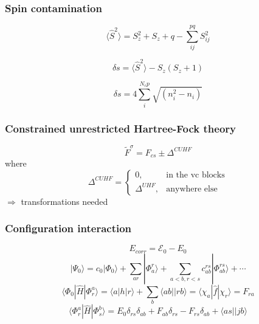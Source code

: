 \documentclass[aspectratio=169]{beamer}
\begin{document}
\begin{frame}
    \frametitle{Spin contamination}
    \begin{equation}
        \langle \hat{S}^2 \rangle = S_z^2 + S_z + q - \sum_{ij}^{pq}S_{ij}^2
    \end{equation}

    \begin{equation}
        \delta s = \langle \hat{S}^2 \rangle - S_z(S_z + 1)
    \end{equation}

    \begin{equation}
        \delta s = 4\sum^{N_cp}_i \sqrt{(n_i^2 - n_i)}
    \end{equation}

\end{frame}

\begin{frame}
    \frametitle{Constrained unrestricted Hartree-Fock theory}
    \begin{equation}
        \tilde{F}^{\sigma} = F_{cs} \pm \Delta^{CUHF}
    \end{equation}
    where
    \begin{equation}
        \Delta^{CUHF} = \begin{cases}
            0, & \mbox{in the vc blocks} \\
            \Delta^{UHF}, & \mbox{anywhere else}
        \end{cases}
    \end{equation}
    $\Longrightarrow$ transformations needed
\end{frame}

\begin{frame}
    \frametitle{Configuration interaction}
    \begin{equation}\label{eq:Ecorr}
        E_{corr} = \mathcal{E}_0 - E_0
      \end{equation}     
    \begin{equation}\label{eq:lincomb}
        |\Psi_0\rangle = c_0|\Phi_0\rangle + \sum_{ar}|\Phi_a^r\rangle + \sum_{a<b,r<s}c_{ab}^{rs}|\Phi^{rs}_{ab} \rangle + \cdots
      \end{equation}
      \begin{equation}\label{eq:overlapsingle}
        \langle\Phi_0 |\hat{H}|\Phi_r^a\rangle = \langle a|h|r \rangle + \sum_b \langle ab||rb \rangle = \langle \chi_a |\hat{f}| \chi_r \rangle = F_{ra}
      \end{equation}
      \begin{equation}\label{eq:matrixelement}
        \langle \Phi_r^a|\hat{H}|\Phi_s^b \rangle = E_0\delta_{rs}\delta_{ab} + F_{ab}\delta_{rs} - F_{rs}\delta_{ab} + \langle as || jb \rangle
      \end{equation}
\end{frame}
\end{document}
